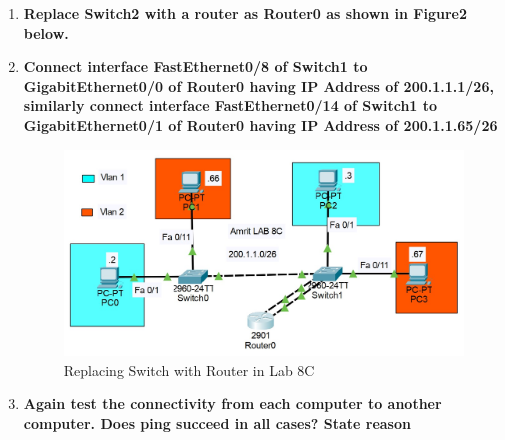 \documentclass[a4paper,11pt]{article}
\begin{document}
\begin{enumerate}
    \item\textbf{  Replace Switch2 with a router as Router0 as shown in Figure2 below.}



    \item\textbf{  Connect interface FastEthernet0/8 of Switch1 to GigabitEthernet0/0 of Router0 having
              IP Address of 200.1.1.1/26, similarly connect interface FastEthernet0/14 of Switch1 to
              GigabitEthernet0/1 of Router0 having IP Address of 200.1.1.65/26}

          \begin{figure}[H]
              \centering
              \includegraphics[scale=0.68,cframe=blue 0.5pt 3pt]{./FIG/Lab8C4.jpg}
              \caption{Replacing Switch with Router in Lab 8C}
          \end{figure}




    \item\textbf{  Again test the connectivity from each computer to another computer. Does ping succeed
              in all cases? State reason}




\end{enumerate}
\end{document}
